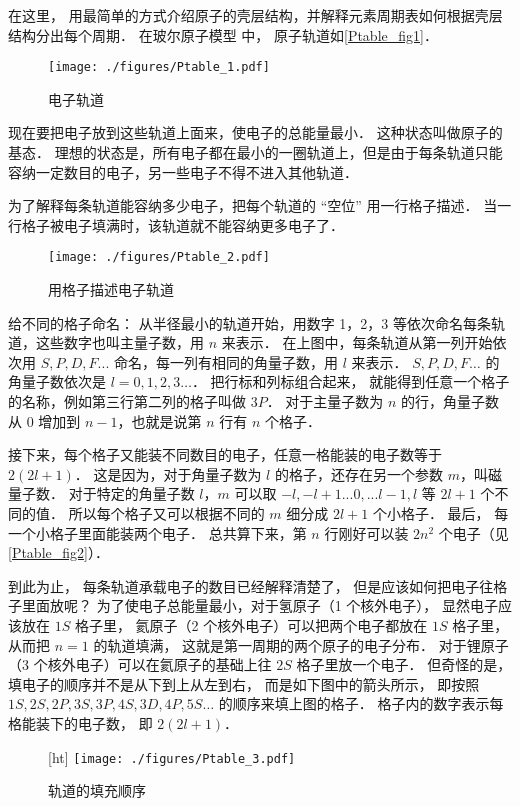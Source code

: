 
在这里， 用最简单的方式介绍原子的壳层结构，并解释元素周期表如何根据壳层结构分出每个周期． 在玻尔原子模型 中， 原子轨道如\autoref{Ptable_fig1}．

\begin{figure}[ht]
\centering
\texttt{[image: ./figures/Ptable\_1.pdf]}
\caption{电子轨道}\label{Ptable_fig1}
\end{figure}
现在要把电子放到这些轨道上面来，使电子的总能量最小． 这种状态叫做原子的基态． 理想的状态是，所有电子都在最小的一圈轨道上，但是由于每条轨道只能容纳一定数目的电子，另一些电子不得不进入其他轨道．

为了解释每条轨道能容纳多少电子，把每个轨道的 “空位” 用一行格子描述． 当一行格子被电子填满时，该轨道就不能容纳更多电子了．
\begin{figure}[ht]
\centering
\texttt{[image: ./figures/Ptable\_2.pdf]}
\caption{用格子描述电子轨道} 
\end{figure}
给不同的格子命名： 从半径最小的轨道开始，用数字 1，2，3 等依次命名每条轨道，这些数字也叫主量子数，用 $n$ 来表示． 在上图中，每条轨道从第一列开始依次用 $S,P,D,F...$ 命名，每一列有相同的角量子数，用 $l$ 来表示．  $S,P,D,F\dots$ 的角量子数依次是 $l = 0,1,2,3\dots$． 把行标和列标组合起来， 就能得到任意一个格子的名称，例如第三行第二列的格子叫做 $3P$． 对于主量子数为 $n$ 的行，角量子数从 0 增加到 $n-1$，也就是说第 $n$ 行有 $n$ 个格子．

接下来，每个格子又能装不同数目的电子，任意一格能装的电子数等于 $2(2l + 1)$． 这是因为，对于角量子数为 $l$ 的格子，还存在另一个参数 $m$，叫磁量子数． 对于特定的角量子数 $l$，$m$ 可以取 $ - l, - l + 1...0,...l - 1,l$ 等 $2l + 1$ 个不同的值． 所以每个格子又可以根据不同的 $m$ 细分成 $2l+1$ 个小格子． 最后， 每一个小格子里面能装两个电子． 总共算下来，第 $n$ 行刚好可以装 $2n^2$ 个电子（见\autoref{Ptable_fig2}）．

到此为止， 每条轨道承载电子的数目已经解释清楚了， 但是应该如何把电子往格子里面放呢？ 为了使电子总能量最小，对于氢原子（1 个核外电子）， 显然电子应该放在 $1S$ 格子里， 氦原子（2 个核外电子）可以把两个电子都放在 $1S$ 格子里， 从而把 $n=1$ 的轨道填满， 这就是第一周期的两个原子的电子分布． 对于锂原子（3 个核外电子）可以在氦原子的基础上往 $2S$ 格子里放一个电子． 但奇怪的是， 填电子的顺序并不是从下到上从左到右， 而是如下图中的箭头所示， 即按照 $1S, 2S, 2P, 3S, 3P, 4S, 3D, 4P, 5S\dots$ 的顺序来填上图的格子． 格子内的数字表示每格能装下的电子数， 即 $2(2l + 1)$．
\begin{figure}\label{Ptable_fig2}[ht]
\centering
\texttt{[image: ./figures/Ptable\_3.pdf]}
\caption{轨道的填充顺序} 
\end{figure}

